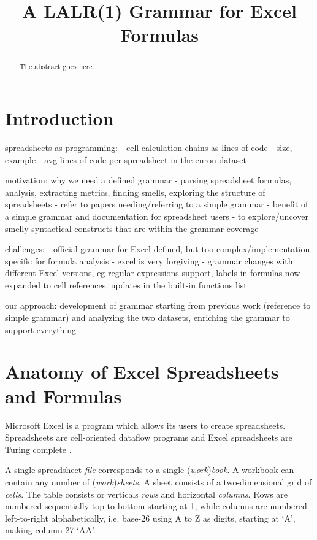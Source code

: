 \documentclass[conference]{IEEEtran}
\begin{document}
\title{A LALR(1) Grammar for Excel Formulas}

\maketitle


\begin{abstract}

The abstract goes here.
\end{abstract}

\IEEEpeerreviewmaketitle


\section{Introduction}

spreadsheets as programming:
- cell calculation chains as lines of code - size, example
- avg lines of code per spreadsheet in the enron dataset

motivation: why we need a defined grammar
- parsing spreadsheet formulas, analysis, extracting metrics, finding smells, exploring the structure of spreadsheets
- refer to papers needing/referring to a simple grammar
- benefit of a simple grammar and documentation for spreadsheet users
- to explore/uncover smelly syntactical constructs that are within the grammar coverage

challenges:
- official grammar for Excel defined, but too complex/implementation specific for formula analysis
- excel is very forgiving
- grammar changes with different Excel versions, eg regular expressions support, labels in formulas now expanded to cell
references, updates in the built-in functions list

our approach:
development of grammar starting from previous work (reference to simple grammar) and analyzing the two datasets, enriching the
grammar to support everything

\section{Anatomy of Excel Spreadsheets and Formulas}

Microsoft Excel is a program which allows its users to create spreadsheets.
Spreadsheets are cell-oriented dataflow programs and Excel spreadsheets are Turing complete \cite{ExcelTuringComplete}.

A single spreadsheet \emph{file} corresponds to a single (\emph{work})\emph{book}.
A workbook can contain any number of (\emph{work})\emph{sheets}.
A sheet consists of a two-dimensional grid of \emph{cells}.
The table consists or verticals \emph{rows} and horizontal \emph{columns}.
Rows are numbered sequentially top-to-bottom starting at 1, while columns are numbered left-to-right alphabetically, i.e. base-26 using A to Z as digits, starting at `A', making column 27 `AA'.
\end{document}
